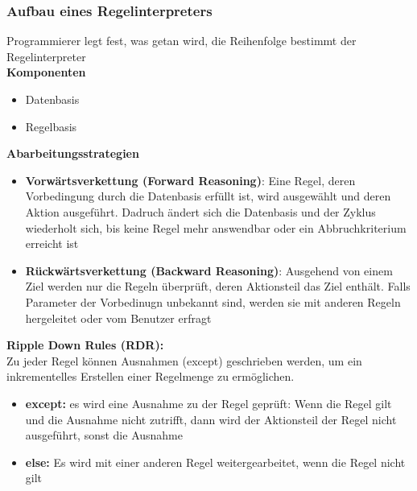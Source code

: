 \documentclass[14pt]{article}
\begin{document}
\subsubsection{Aufbau eines Regelinterpreters}
Programmierer legt fest, was getan wird, die Reihenfolge bestimmt der 
Regelinterpreter \\
\textbf{Komponenten}
\begin{itemize}
    \item Datenbasis
    \item Regelbasis
\end{itemize}
\textbf{Abarbeitungsstrategien}
\begin{itemize}
    \item \textbf{Vorwärtsverkettung (Forward Reasoning)}: Eine Regel, deren 
    Vorbedingung durch die Datenbasis erfüllt ist, wird ausgewählt und deren 
    Aktion ausgeführt. Dadruch ändert sich die Datenbasis und der Zyklus
    wiederholt sich, bis keine Regel mehr answendbar oder ein Abbruchkriterium
    erreicht ist
    \item \textbf{Rückwärtsverkettung (Backward Reasoning)}: Ausgehend von einem
    Ziel werden nur die Regeln überprüft, deren Aktionsteil das Ziel enthält.
    Falls Parameter der Vorbedinugn unbekannt sind, werden sie mit anderen 
    Regeln hergeleitet oder vom Benutzer erfragt
\end{itemize}
\textbf{Ripple Down Rules (RDR):} \\
Zu jeder Regel können Ausnahmen (except) geschrieben werden, um ein 
inkrementelles Erstellen einer Regelmenge zu ermöglichen. \\
\begin{itemize}
    \item \textbf{except:} es wird eine Ausnahme zu der Regel geprüft: Wenn
    die Regel gilt und die Ausnahme nicht zutrifft, dann wird der Aktionsteil
    der Regel nicht ausgeführt, sonst die Ausnahme
    \item \textbf{else:} Es wird mit einer anderen Regel weitergearbeitet,
    wenn die Regel nicht gilt
\end{itemize}
\end{document}

